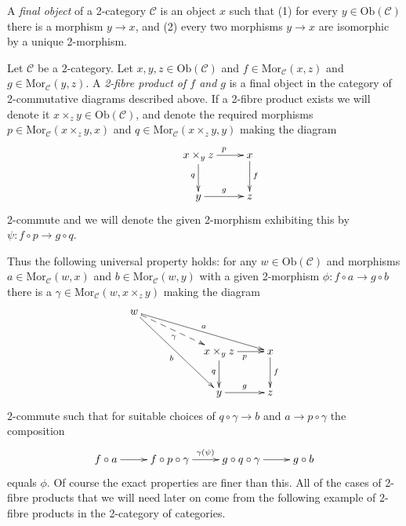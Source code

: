 \begin{definition}
\label{definition-final-object-2-category}
A {\it final object} of a 2-category $\mathcal{C}$ is an object $x$ such that
(1) for every $y \in \text{Ob}(\mathcal{C})$ there is a morphism $y \to x$,
and (2) every two morphisms $y \to x$ are isomorphic by a unique 2-morphism.
\end{definition}

\begin{definition}
\label{definition-2-fibre-products}
Let $\mathcal{C}$ be a $2$-category.
Let $x,y,z\in \text{Ob}(\mathcal{C})$ and $f\in \text{Mor}_{\mathcal{C}}(x,z)$
and $g\in \text{Mor}_{\mathcal C}(y,z)$. A 
{\it 2-fibre product of $f$ and $g$} is
a final object in the category of 2-commutative diagrams described above. If
a 2-fibre product exists we
will denote it $x\times_z y\in \text{Ob}(\mathcal{C})$, and denote the
required morphisms $p\in \text{Mor}_{\mathcal C}(x\times_z y,x)$ and 
$q\in \text{Mor}_{\mathcal C}(x\times_z y,y)$ making the diagram
$$
\xymatrix{
&x\times_y z \ar[r]^{p} \ar[d]_{q} & x \ar[d]^{f} \\
&y \ar[r]^{g} & z }
$$
2-commute and we will denote the given 2-morphism exhibiting this by
$\psi : f \circ p \to g \circ q$.
\end{definition}

\noindent
Thus the following universal property holds: for any
$w\in \text{Ob}(\mathcal{C})$ and morphisms 
$a \in \text{Mor}_{\mathcal C}(w,x)$ and 
$b \in \text{Mor}_{\mathcal{C}}(w,y)$ with a given 2-morphism
$\phi : f \circ a \to g\circ b$
there is a $\gamma \in \text{Mor}_{\mathcal C}(w,x\times_z y)$
making the diagram
$$
\xymatrix{
w\ar[rrrd]^a \ar@{-->}[rrd]_\gamma \ar[rrdd]_b &&\\
&&x\times_y z \ar[r]_{p} \ar[d]_{q} & x \ar[d]^{f} \\
&&y \ar[r]^{g} & z }
$$
2-commute such that for suitable choices of $q \circ \gamma \to b$
and $a \to p \circ \gamma$ the composition
$$
\xymatrix{
f \circ a \ar[r] &
f \circ p \circ \gamma \ar[r]^{\gamma(\psi)} &
g \circ q \circ \gamma \ar[r] &
g\circ b }
$$
equals $\phi$. Of course the exact properties are finer than this. All of the
cases of 2-fibre products that we will need later on come from the following
example of 2-fibre products in the 2-category of categories.

